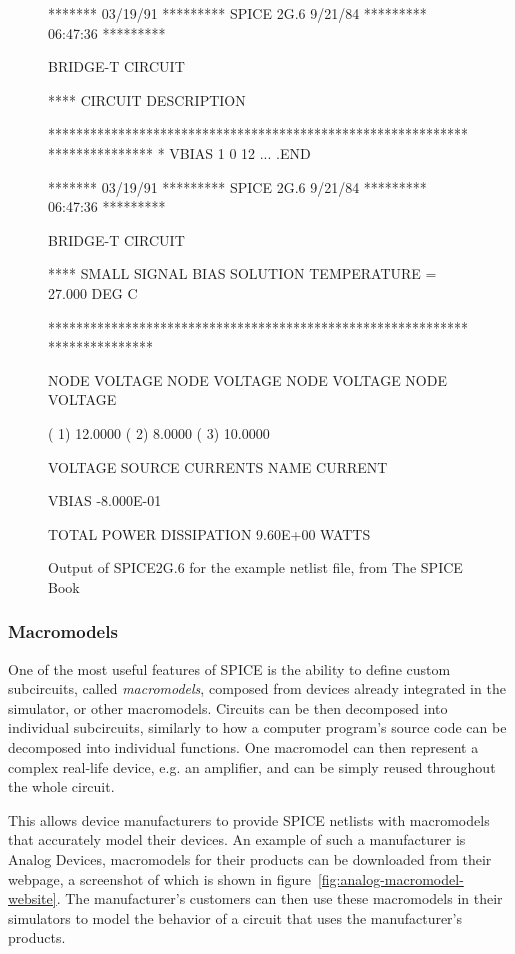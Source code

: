 \begin{figure}[h]
	\begin{spicecode}
\color{lightgray}******* 03/19/91 ********* SPICE 2G.6  9/21/84 ********* 06:47:36 *********
	
\color{lightgray}BRIDGE-T CIRCUIT
	
\color{lightgray} ****     CIRCUIT DESCRIPTION

\color{lightgray}***************************************************************************
\color{lightgray}*
\color{lightgray}VBIAS 1 0 12
\color{lightgray}...
\color{lightgray}.END

******* 03/19/91 ********* SPICE 2G.6  9/21/84 ********* 06:47:36 *********

BRIDGE-T CIRCUIT

 ****  SMALL SIGNAL BIAS SOLUTION   TEMPERATURE = 27.000 DEG C
 
***************************************************************************

 NODE    VOLTAGE     NODE    VOLTAGE     NODE    VOLTAGE    NODE   VOLTAGE

(    1)    12.0000  (    2)     8.0000  (    3)    10.0000 

    VOLTAGE SOURCE CURRENTS
    NAME         CURRENT
    
    VBIAS       -8.000E-01
    
    TOTAL POWER DISSIPATION 9.60E+00 WATTS
	\end{spicecode}
	\caption{Output of SPICE2G.6 for the example netlist file, from The SPICE Book \cite{spice_book}}
	\label{fig:example_output}
\end{figure}


\subsubsection*{Macromodels}
One of the most useful features of SPICE is the ability to define custom subcircuits, called \textit{macromodels}, composed from devices already integrated in the simulator, or other macromodels. Circuits can be then decomposed into individual subcircuits, similarly to how a computer program's source code can be decomposed into individual functions. One macromodel can then represent a complex real-life device, e.g. an amplifier, and can be simply reused throughout the whole circuit.

This allows device manufacturers to provide SPICE netlists with macromodels that accurately model their devices. An example of such a manufacturer is Analog Devices, macromodels for their products can be downloaded from their webpage, a screenshot of which is shown in figure~\ref{fig:analog-macromodel-website}. The manufacturer's customers can then use these macromodels in their simulators to model the behavior of a circuit that uses the manufacturer's products.

